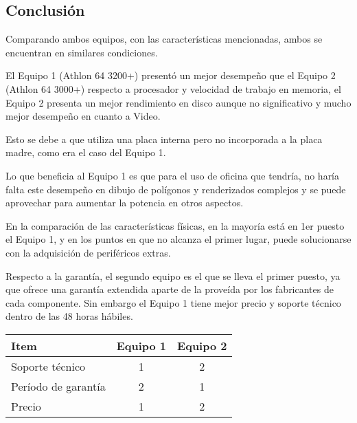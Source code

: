 \subsection{Conclusión}
Comparando ambos equipos, con las características mencionadas, ambos se 
encuentran en similares condiciones.

El Equipo 1 (Athlon 64 3200+) presentó un mejor desempeño que el Equipo 2 
(Athlon 64 3000+) respecto a procesador y velocidad de trabajo en memoria,
el Equipo 2 presenta un mejor rendimiento en disco aunque no significativo
y mucho mejor desempeño en cuanto a Video.

Esto se debe a que utiliza una placa interna pero no incorporada a la placa
madre, como era el caso del Equipo 1.

Lo que beneficia al Equipo 1 es que para el uso de oficina que tendría, no
haría falta este desempeño en dibujo de polígonos y renderizados complejos
y se puede aprovechar para aumentar la potencia en otros aspectos.

En la comparación de las características físicas, en la mayoría está en 1er 
puesto el Equipo 1, y en los puntos en que no alcanza el primer lugar, puede 
solucionarse con la adquisición de periféricos extras.

Respecto a la garantía, el segundo equipo es el que se lleva el primer puesto, 
ya que ofrece una garantía extendida aparte de la proveída por los fabricantes 
de cada componente. Sin embargo el Equipo 1 tiene mejor precio y soporte 
técnico dentro de las 48 horas hábiles.

\begin{center}
\begin{tabular}{|lcc|} \hline
\footnotesize\textbf{Item} & \footnotesize\textbf{Equipo 1} & \footnotesize\textbf{Equipo 2} \\\hline
Soporte técnico & 1 & 2 \\\hline
Período de garantía & 2 & 1 \\\hline
Precio & 1 & 2 \\\hline
\end{tabular}
\end{center}

